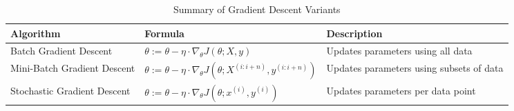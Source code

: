 \begin{table}[htb!]
\caption{Summary of Gradient Descent Variants}
\label{Table:GradientDescent}
\centering
\footnotesize
\begin{tabularx}{\textwidth}{@{}lXl@{}}
\toprule
\textbf{Algorithm} & \textbf{Formula} & \textbf{Description} \\
\midrule
Batch Gradient Descent & \(\theta := \theta - \eta \cdot \nabla_{\theta} J(\theta; X, y)\) & Updates parameters using all data \\
\addlinespace
Mini-Batch Gradient Descent & \(\theta := \theta - \eta \cdot \nabla_{\theta} J(\theta; X^{(i:i+n)}, y^{(i:i+n)})\) & Updates parameters using subsets of data \\
\addlinespace
Stochastic Gradient Descent & \(\theta := \theta - \eta \cdot \nabla_{\theta} J(\theta; x^{(i)}, y^{(i)})\) & Updates parameters per data point \\
\bottomrule
\end{tabularx}
\end{table}
